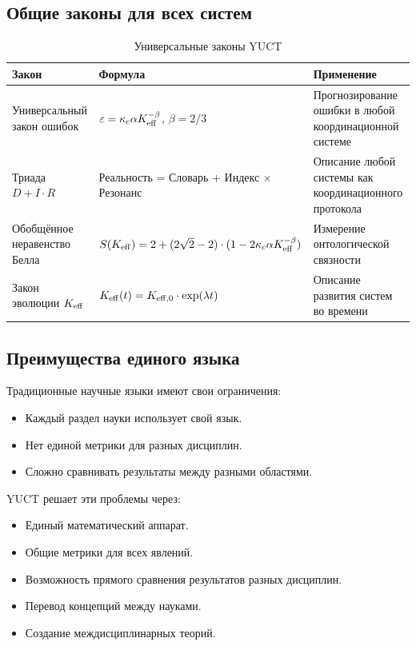 \documentclass[12pt,a4paper]{article}
\begin{document}
	\subsection{Общие законы для всех систем}
	
	\begin{table}[H]
		\centering
		\caption{Универсальные законы YUCT}
		\label{tab:universal-laws}
		\begin{tabular}{p{5cm}p{6cm}p{5cm}}
			\toprule
			\textbf{Закон} & \textbf{Формула} & \textbf{Применение} \\
			\midrule
			Универсальный закон ошибок & \(\varepsilon = \kappa_c \alpha \Keff^{-\beta}\), \(\beta = 2/3\) & Прогнозирование ошибки в любой координационной системе \\
			Триада \(D + I \cdot R\) & Реальность = Словарь + Индекс × Резонанс & Описание любой системы как координационного протокола \\
			Обобщённое неравенство Белла & \(S(\Keff) = 2 + (2\sqrt{2}-2)\cdot(1 - 2\kappa_c \alpha \Keff^{-\beta})\) & Измерение онтологической связности \\
			Закон эволюции \(\Keff\) & \(\Keff(t) = \Keff[0] \cdot \exp(\lambda t)\) & Описание развития систем во времени \\
			\bottomrule
		\end{tabular}
	\end{table}
	
	\subsection{Преимущества единого языка}
	
	Традиционные научные языки имеют свои ограничения:
	\begin{itemize}
		\item Каждый раздел науки использует свой язык.
		\item Нет единой метрики для разных дисциплин.
		\item Сложно сравнивать результаты между разными областями.
	\end{itemize}
	
	YUCT решает эти проблемы через:
	\begin{itemize}
		\item Единый математический аппарат.
		\item Общие метрики для всех явлений.
		\item Возможность прямого сравнения результатов разных дисциплин.
		\item Перевод концепций между науками.
		\item Создание междисциплинарных теорий.
	\end{itemize}
	
\end{document}
